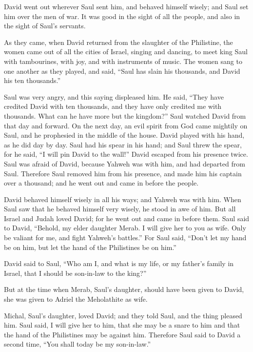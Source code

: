  David went out wherever Saul sent him, and behaved
himself wisely; and Saul set him over the men of war. It was good in the
sight of all the people, and also in the sight of Saul's servants.

 As they came, when David returned from the slaughter of
the Philistine, the women came out of all the cities of Israel, singing
and dancing, to meet king Saul with tambourines, with joy, and with
instruments of music.  The women sang to one another as
they played, and said, ``Saul has slain his thousands, and David his ten
thousands.''

 Saul was very angry, and this saying displeased him. He
said, ``They have credited David with ten thousands, and they have only
credited me with thousands. What can he have more but the kingdom?''
 Saul watched David from that day and forward.
 On the next day, an evil spirit from God came mightily
on Saul, and he prophesied in the middle of the house. David played with
his hand, as he did day by day. Saul had his spear in his hand;
 and Saul threw the spear, for he said, ``I will pin
David to the wall!'' David escaped from his presence twice.
 Saul was afraid of David, because Yahweh was with him,
and had departed from Saul.  Therefore Saul removed him
from his presence, and made him his captain over a thousand; and he went
out and came in before the people.

 David behaved himself wisely in all his ways; and Yahweh
was with him.  When Saul saw that he behaved himself very
wisely, he stood in awe of him.  But all Israel and Judah
loved David; for he went out and came in before them. 
Saul said to David, ``Behold, my elder daughter Merab. I will give her
to you as wife. Only be valiant for me, and fight Yahweh's battles.''
For Saul said, ``Don't let my hand be on him, but let the hand of the
Philistines be on him.''

 David said to Saul, ``Who am I, and what is my life, or
my father's family in Israel, that I should be son-in-law to the king?''

 But at the time when Merab, Saul's daughter, should have
been given to David, she was given to Adriel the Meholathite as wife.

 Michal, Saul's daughter, loved David; and they told
Saul, and the thing pleased him.  Saul said, I will give
her to him, that she may be a snare to him and that the hand of the
Philistines may be against him. Therefore Saul said to David a second
time, ``You shall today be my son-in-law.''

